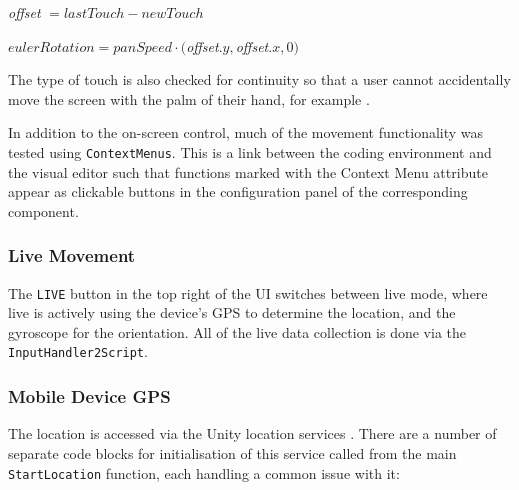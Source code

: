 \documentclass[12pt, a4paper]{article}
\begin{document}
\hspace{1cm} \textit{offset} $ = lastTouch - newTouch$

\hspace{1cm} $eulerRotation = panSpeed \cdot ($\textit{offset}$.y, $\textit{offset}$.x, 0)$

The type of touch is also checked for continuity so that a user cannot accidentally move the screen with the palm of their hand, for example \cite{movement:touchcontrol}. 

In addition to the on-screen control, much of the movement functionality was tested using \verb|ContextMenus|. This is a link between the coding environment and the visual editor such that functions marked with the Context Menu attribute appear as clickable buttons in the configuration panel of the corresponding component.

\subsubsection{Live Movement}
The \verb|LIVE| button in the top right of the UI switches between \gls{live} mode, where live is actively using the device's GPS to determine the location, and the gyroscope for the orientation. All of the live data collection is done via the \verb|InputHandler2Script|. 

\subsubsection{Mobile Device GPS}
The location is accessed via the Unity location services \cite{movement:locationservice}. There are a number of separate code blocks for initialisation of this service called from the main \verb|StartLocation| function, each handling a common issue with it:
\end{document}
